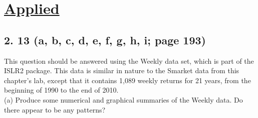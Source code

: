 \documentclass{article}
\begin{document}
\section*{\underline{Applied}}
\subsection*{2. 13 (a, b, c, d, e, f, g, h, i; page 193)}
This question should be answered using the Weekly data set, which is part of the ISLR2 package. This data is similar in nature to the Smarket data from this chapter’s lab, except that it contains 1,089 weekly returns for 21 years, from the beginning of 1990 to the end of 2010. \\
(a) Produce some numerical and graphical summaries of the Weekly data. Do there appear to be any patterns? \\
\end{document}
